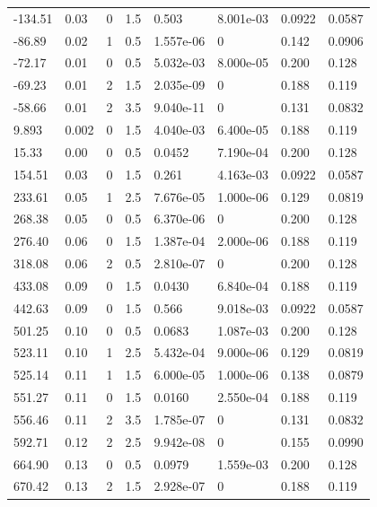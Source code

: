 \documentclass[preview]{standalone}
\begin{document}
{{\begin{tabular}{L{1.2cm}C{1.2cm} C{0.3cm}C{0.5cm} C{1.4cm}C{1.4cm} C{1.4cm}C{1.4cm}}
  -134.51  &  0.03  & 0     & 1.5 &  0.503  & 8.001e-03  & 0.0922 &  0.0587   \\ 
  -86.89  &  0.02  & 1     & 0.5 &  1.557e-06  & 0  & 0.142 &  0.0906   \\ 
  -72.17  &  0.01  & 0     & 0.5 &  5.032e-03  & 8.000e-05  & 0.200 &  0.128   \\ 
  -69.23  &  0.01  & 2     & 1.5 &  2.035e-09  & 0  & 0.188 &  0.119   \\ 
  -58.66  &  0.01  & 2     & 3.5 &  9.040e-11  & 0  & 0.131 &  0.0832   \\ 
  9.893  &  0.002  & 0     & 1.5 &  4.040e-03  & 6.400e-05  & 0.188 &  0.119   \\ 
  15.33  &  0.00  & 0     & 0.5 &  0.0452  & 7.190e-04  & 0.200 &  0.128   \\ 
  154.51  &  0.03  & 0     & 1.5 &  0.261  & 4.163e-03  & 0.0922 &  0.0587   \\ 
  233.61  &  0.05  & 1     & 2.5 &  7.676e-05  & 1.000e-06  & 0.129 &  0.0819   \\ 
  268.38  &  0.05  & 0     & 0.5 &  6.370e-06  & 0  & 0.200 &  0.128   \\ 
  276.40  &  0.06  & 0     & 1.5 &  1.387e-04  & 2.000e-06  & 0.188 &  0.119   \\ 
  318.08  &  0.06  & 2     & 0.5 &  2.810e-07  & 0  & 0.200 &  0.128   \\ 
  433.08  &  0.09  & 0     & 1.5 &  0.0430  & 6.840e-04  & 0.188 &  0.119   \\ 
  442.63  &  0.09  & 0     & 1.5 &  0.566  & 9.018e-03  & 0.0922 &  0.0587   \\ 
  501.25  &  0.10  & 0     & 0.5 &  0.0683  & 1.087e-03  & 0.200 &  0.128   \\ 
  523.11  &  0.10  & 1     & 2.5 &  5.432e-04  & 9.000e-06  & 0.129 &  0.0819   \\ 
  525.14  &  0.11  & 1     & 1.5 &  6.000e-05  & 1.000e-06  & 0.138 &  0.0879   \\ 
  551.27  &  0.11  & 0     & 1.5 &  0.0160  & 2.550e-04  & 0.188 &  0.119   \\ 
  556.46  &  0.11  & 2     & 3.5 &  1.785e-07  & 0  & 0.131 &  0.0832   \\ 
  592.71  &  0.12  & 2     & 2.5 &  9.942e-08  & 0  & 0.155 &  0.0990   \\ 
  664.90  &  0.13  & 0     & 0.5 &  0.0979  & 1.559e-03  & 0.200 &  0.128   \\ 
  670.42  &  0.13  & 2     & 1.5 &  2.928e-07  & 0  & 0.188 &  0.119   \\ 

\end{tabular}}}
\end{document}
